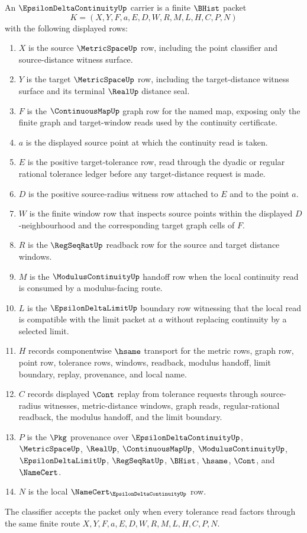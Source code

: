 \begin{definition}
\label{def:epsilon-delta-continuity-carrier}
An $\EpsilonDeltaContinuityUp$ carrier is a finite $\BHist$ packet
$$
K=(X,Y,F,a,E,D,W,R,M,L,H,C,P,N)
$$
with the following displayed rows:
\begin{enumerate}
\item $X$ is the source $\MetricSpaceUp$ row, including the point classifier and source-distance witness surface.
\item $Y$ is the target $\MetricSpaceUp$ row, including the target-distance witness surface and its terminal $\RealUp$ distance seal.
\item $F$ is the $\ContinuousMapUp$ graph row for the named map, exposing only the finite graph and target-window reads used by the continuity certificate.
\item $a$ is the displayed source point at which the continuity read is taken.
\item $E$ is the positive target-tolerance row, read through the dyadic or regular rational tolerance ledger before any target-distance request is made.
\item $D$ is the positive source-radius witness row attached to $E$ and to the point $a$.
\item $W$ is the finite window row that inspects source points within the displayed $D$-neighbourhood and the corresponding target graph cells of $F$.
\item $R$ is the $\RegSeqRatUp$ readback row for the source and target distance windows.
\item $M$ is the $\ModulusContinuityUp$ handoff row when the local continuity read is consumed by a modulus-facing route.
\item $L$ is the $\EpsilonDeltaLimitUp$ boundary row witnessing that the local read is compatible with the limit packet at $a$ without replacing continuity by a selected limit.
\item $H$ records componentwise $\hsame$ transport for the metric rows, graph row, point row, tolerance rows, windows, readback, modulus handoff, limit boundary, replay, provenance, and local name.
\item $C$ records displayed $\Cont$ replay from tolerance requests through source-radius witnesses, metric-distance windows, graph reads, regular-rational readback, the modulus handoff, and the limit boundary.
\item $P$ is the $\Pkg$ provenance over $\EpsilonDeltaContinuityUp$, $\MetricSpaceUp$, $\RealUp$, $\ContinuousMapUp$, $\ModulusContinuityUp$, $\EpsilonDeltaLimitUp$, $\RegSeqRatUp$, $\BHist$, $\hsame$, $\Cont$, and $\NameCert$.
\item $N$ is the local $\NameCert_{\EpsilonDeltaContinuityUp}$ row.
\end{enumerate}
The classifier accepts the packet only when every tolerance read factors through the same finite route $X,Y,F,a,E,D,W,R,M,L,H,C,P,N$.
\end{definition}

